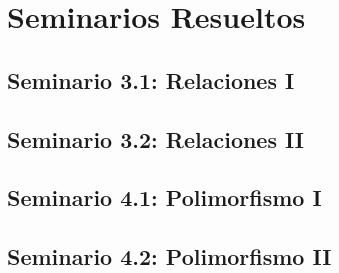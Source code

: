 \chapter{Seminarios Resueltos}

\section{Seminario 3.1: Relaciones I}
  
\newpage
\section{Seminario 3.2: Relaciones II}
  
\newpage
\section{Seminario 4.1: Polimorfismo I}
  
\newpage
\section{Seminario 4.2: Polimorfismo II}
  